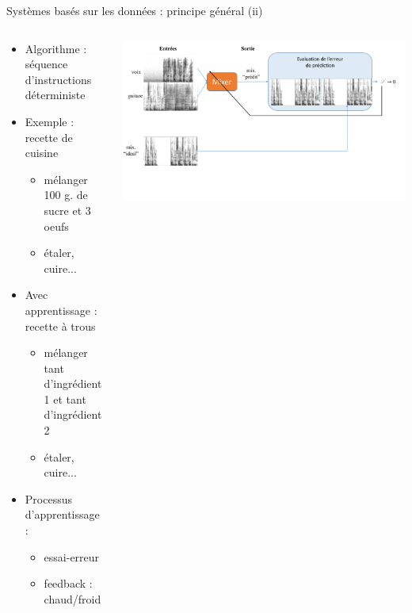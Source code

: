 \documentclass[9pt, aspectratio=169]{beamer}
\begin{document}
\begin{frame}{Systèmes basés sur les données : principe général (ii)} %

\begin{columns}
    \begin{column}{0.6\textwidth}
\begin{itemize}
	\item Algorithme : séquence d'instructions déterministe
	\item Exemple : recette de cuisine
	\begin{itemize}
		\item mélanger 100 g. de sucre et 3 oeufs
		\item étaler, cuire...
	\end{itemize}
	\item Avec apprentissage : recette à trous
	\begin{itemize}
		\item mélanger tant d'ingrédient 1 et tant d'ingrédient 2
		\item étaler, cuire...
	\end{itemize}
	\item Processus d'apprentissage :
	\begin{itemize}
		\item essai-erreur
		\item feedback : chaud/froid
	\end{itemize}
\end{itemize}
\end{column}
    \begin{column}{0.38\textwidth}
    \includegraphics[width=\textwidth, page=1]{fig/schemas.pdf}
    \end{column}
\end{columns}
    
\end{frame}
\end{document}
